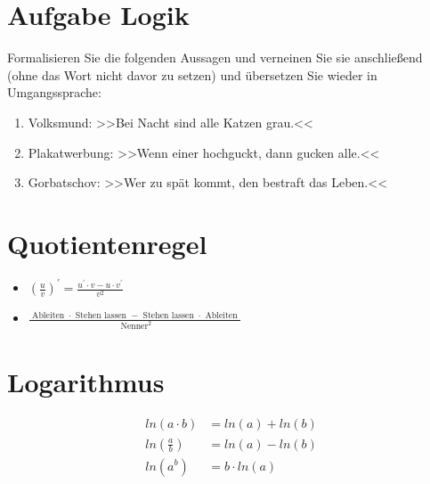 \section{Aufgabe Logik}
    Formalisieren Sie die folgenden Aussagen und verneinen Sie sie anschließend (ohne das Wort nicht davor zu setzen) und übersetzen Sie wieder in Umgangssprache:

    \begin{enumerate}[label=(\alph*)]
        \item Volksmund: >>Bei Nacht sind alle Katzen grau.<<
        \item Plakatwerbung: >>Wenn einer hochguckt, dann gucken alle.<<
        \item Gorbatschov: >>Wer zu spät kommt, den bestraft das Leben.<<
    \end{enumerate}

\section{Quotientenregel}
    \begin{itemize} %
        \item[] $\left(\frac{u}{v}\right)^{\prime} = \frac{u^{\prime} \cdot v-u \cdot v^{\prime}}{v^{2}}$
        
        \item[] $\frac{\text{ Ableiten } \cdot \text{ Stehen lassen } - \text{ Stehen lassen } \cdot \text{ Ableiten }}{\text{ Nenner}^2}$
    \end{itemize}

    
\section{Logarithmus}
    \begin{align}
        ln(a \cdot b)   &= ln(a) + ln(b) \\
        ln(\frac{a}{b}) &= ln(a) - ln(b) \\
        ln(a^b)         &= b \cdot ln(a)
    \end{align}

    \newpage
